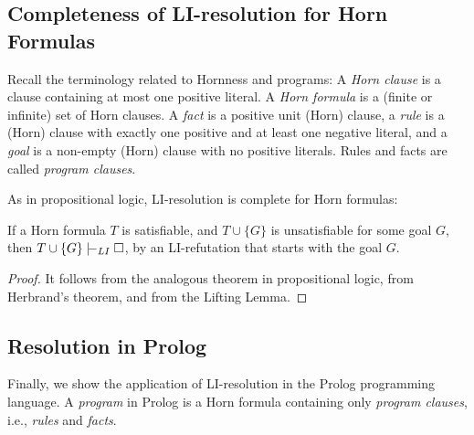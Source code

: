 \subsection{Completeness of LI-resolution for Horn Formulas}

Recall the terminology related to Hornness and programs: A \emph{Horn clause} is a clause containing at most one positive literal. A \emph{Horn formula} is a (finite or infinite) set of Horn clauses.
A \emph{fact} is a positive unit (Horn) clause, a \emph{rule} is a (Horn) clause with exactly one positive and at least one negative literal, and a \emph{goal} is a non-empty (Horn) clause with no positive literals. Rules and facts are called \emph{program clauses}.

As in propositional logic, LI-resolution is complete for Horn formulas:

\begin{theorem}\label{theorem:completeness-of-li-resolution-for-horn-predicate}
If a Horn formula $T$ is satisfiable, and $T\cup\{G\}$ is unsatisfiable for some goal $G$, then $T\cup\{G\}\proves_{LI}\square$, by an LI-refutation that starts with the goal $G$.   
\end{theorem}
\begin{proof}
    It follows from the analogous theorem in propositional logic, from Herbrand's theorem, and from the Lifting Lemma.
\end{proof}


\subsection{Resolution in Prolog}\label{subsection:resolution-in-prolog}

Finally, we show the application of LI-resolution in the Prolog programming language. A \emph{program} in Prolog is a Horn formula containing only \emph{program clauses}, i.e., \emph{rules} and \emph{facts}.

